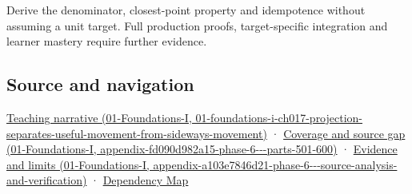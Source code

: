 Derive the denominator, closest-point property and idempotence without assuming a unit target. Full production proofs, target-specific integration and learner mastery require further evidence.

\subsection{Source and navigation}\label{appendix-505a502c372a-source-and-navigation}

\href{../01-Foundations-I/main.pdf\#nameddest=01-foundations-i-ch017-projection-separates-useful-movement-from-sideways-movement}{Teaching narrative (01-Foundations-I, 01-foundations-i-ch017-projection-separates-useful-movement-from-sideways-movement)} · \href{../01-Foundations-I/main.pdf\#nameddest=appendix-fd090d982a15-phase-6---parts-501-600}{Coverage and source gap (01-Foundations-I, appendix-fd090d982a15-phase-6-\/-\/-parts-501-600)} · \href{../01-Foundations-I/main.pdf\#nameddest=appendix-a103e7846d21-phase-6---source-analysis-and-verification}{Evidence and limits (01-Foundations-I, appendix-a103e7846d21-phase-6-\/-\/-source-analysis-and-verification)} · \hyperref[appendix-4ad47bdd269a]{Dependency Map}
